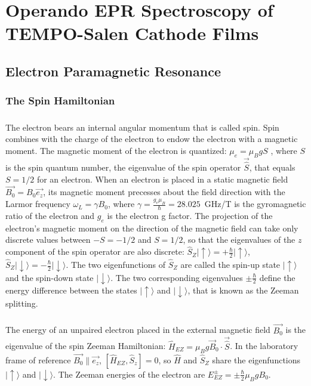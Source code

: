 \chapter{Operando EPR Spectroscopy of TEMPO-Salen Cathode Films}
\section{Electron Paramagnetic Resonance}
\subsection{The Spin Hamiltonian}
\paragraph*{}
The electron bears an internal angular momentum that is called spin. Spin combines with the charge of the electron to endow the electron with a magnetic moment. The magnetic moment of the electron is quantized: $\mu_e=\mu_BgS$ \cite{SternGerlach1922}, where $S$ is the spin quantum number, the eigenvalue of the spin operator $\vec{\hat{S}}$, that equals $S=1/2$ for an electron. When an electron is placed in a static magnetic field $\vec{B_0}=B_0 \vec{e_z}$, its magnetic moment precesses about the field direction with the Larmor frequency $\omega_L = \gamma B_0$, where $\gamma=\frac{g_e\mu_B}{\hbar}=28.025$~GHz/T is the gyromagnetic ratio of the electron and $g_e$ is the electron g factor. The projection of the electron's magnetic moment on the direction of the magnetic field can take only discrete values between $-S=-1/2$ and $S=1/2$, so that the eigenvalues of the $z$ component of the spin operator are also discrete: $\hat{S}_Z\vert{\uparrow\rangle}=+\frac{\hbar}{2}\vert{\uparrow\rangle}$, $\hat{S}_Z\vert{\downarrow\rangle}=-\frac{\hbar}{2}\vert{\downarrow\rangle}$. The two eigenfunctions of $\hat{S}_Z$ are called the spin-up state $\vert{\uparrow\rangle}$ and the spin-down state $\vert{\downarrow\rangle}$. The two corresponding eigenvalues $\pm\frac{\hbar}{2}$ define the energy difference between the states $\vert{\uparrow\rangle}$ and $\vert{\downarrow\rangle}$, that is known as the Zeeman splitting.

\paragraph*{}
The energy of an unpaired electron placed in the external magnetic field $\vec{B_0}$ is the eigenvalue of the spin Zeeman Hamiltonian: $\hat{H}_{EZ} = \mu_B g\vec{B}_0\cdot\vec{\hat{S}}$. In the laboratory frame of reference $\vec{B_0}\parallel\vec{e_z}$, $\left[\hat{H}_{EZ},\hat{S}_z\right]=0$, so $\hat{H}$ and $\hat{S}_Z$ share the eigenfunctions $\vert{\uparrow\rangle}$ and $\vert{\downarrow\rangle}$. The Zeeman energies of the electron are $E_{EZ}^{\pm} = \pm \frac{\hbar}{2}\mu_B g B_0$. 

